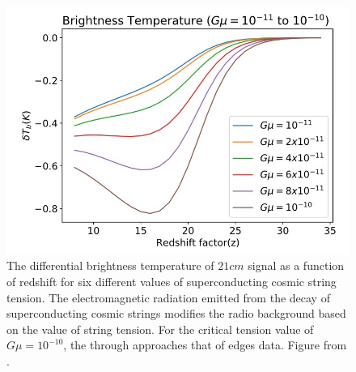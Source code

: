 \documentclass[12pt, TexShade, letterpaper]{report}
\begin{document}
\begin{figure}[h!]
    \centering
    \includegraphics[scale = 0.8]{21cm_cosmic_string.jpg}
    \caption[The global $21cm$ for different values of superconducting cosmic string tension]{The differential brightness temperature of $21cm$ signal as a function of redshift for six different values of superconducting cosmic string tension. The electromagnetic radiation emitted from the decay of superconducting cosmic strings modifies the radio background based on the value of string tension. For the critical tension value of $G\mu = 10 ^{-10}$, the through approaches that of \gls{edges} data. Figure from \cite{cosmic_string_jordan_robert}.}
    \label{fig:21cm_cosmic_string}
\end{figure}

\end{document}
